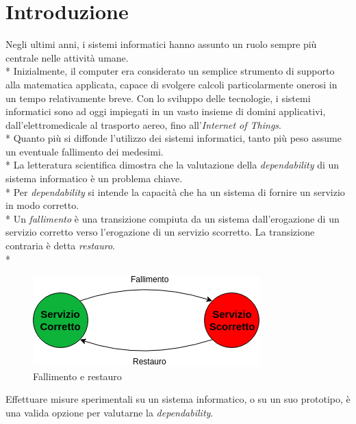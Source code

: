 \chapter{Introduzione}
Negli ultimi anni, i sistemi informatici hanno assunto un ruolo sempre pi\`u centrale nelle attivit\`a umane.\\*
Inizialmente, il computer era considerato un semplice strumento di supporto alla matematica applicata, capace di svolgere calcoli particolarmente onerosi in un tempo relativamente breve. Con lo sviluppo delle tecnologie, i sistemi informatici sono ad oggi impiegati in un vasto insieme di domini applicativi, dall'elettromedicale al trasporto aereo, fino all'\emph{Internet of Things}.\\*
Quanto pi\`u si diffonde l'utilizzo dei sistemi informatici, tanto pi\`u peso assume un eventuale fallimento dei medesimi.\\*
La letteratura scientifica dimostra che la valutazione della \emph{dependability} di un sistema informatico \`e un problema chiave.\\*
Per \emph{dependability} si intende la capacit\`a che ha un sistema di fornire un servizio in modo corretto. \cite{depdef}\\*
Un \emph{fallimento} \`e una transizione compiuta da un sistema dall'erogazione di un servizio corretto verso l'erogazione di un servizio scorretto. La transizione contraria \`e detta \emph{restauro}.\\*
\begin{figure}[h]
	\centering
	\includegraphics[width=0.7\linewidth]{img/FallimentoRestauro}
	\caption{Fallimento e restauro}
	\label{fig:fallimentorestauro}
\end{figure}\newpage
Effettuare misure sperimentali su un sistema informatico, o su un suo prototipo, \`e una valida opzione per valutarne la \emph{dependability}.
